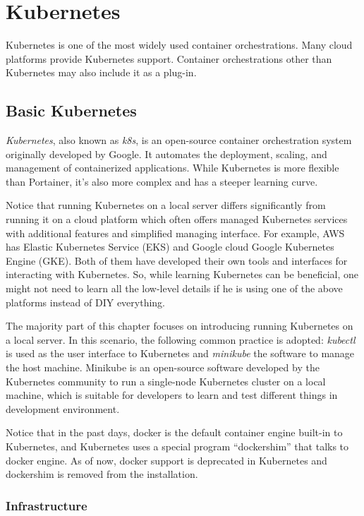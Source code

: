 \chapter{Kubernetes}

Kubernetes is one of the most widely used container orchestrations. Many cloud platforms provide Kubernetes support. Container orchestrations other than Kubernetes may also include it as a plug-in.

\section{Basic Kubernetes}

\textit{Kubernetes}, also known as \textit{k8s}, is an open-source container orchestration system originally developed by Google. It automates the deployment, scaling, and management of containerized applications. While Kubernetes is more flexible than Portainer, it's also more complex and has a steeper learning curve.

Notice that running Kubernetes on a local server differs significantly from running it on a cloud platform  which often offers managed Kubernetes services with additional features and simplified managing interface. For example, AWS has Elastic Kubernetes Service (EKS) and Google cloud Google Kubernetes Engine (GKE). Both of them have developed their own tools and interfaces for interacting with Kubernetes. So, while learning Kubernetes can be beneficial, one might not need to learn all the low-level details if he is using one of the above platforms instead of DIY everything.

The majority part of this chapter focuses on introducing running Kubernetes on a local server. In this scenario, the following common practice is adopted: \textit{kubectl} is used as the user interface to Kubernetes and \textit{minikube} the software to manage the host machine. Minikube is an open-source software developed by the Kubernetes community to run a single-node Kubernetes cluster on a local machine, which is suitable for developers to learn and test different things in development environment.

Notice that in the past days, docker is the default container engine built-in to Kubernetes, and Kubernetes uses a special program ``dockershim'' that talks to docker engine. As of now, docker support is deprecated in Kubernetes and dockershim is removed from the installation.

\subsection{Infrastructure}

